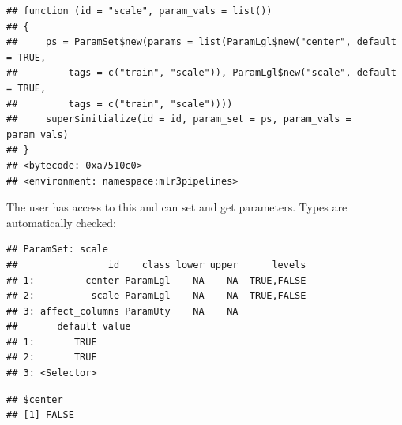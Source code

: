 \documentclass[]{article}
\newenvironment{Shaded}{\begin{snugshade}}{\end{snugshade}}
\newcommand{\CommentTok}[1]{\textcolor[rgb]{0.56,0.35,0.01}{\textit{#1}}}
\newcommand{\KeywordTok}[1]{\textcolor[rgb]{0.13,0.29,0.53}{\textbf{#1}}}
\newcommand{\NormalTok}[1]{#1}
\newcommand{\OperatorTok}[1]{\textcolor[rgb]{0.81,0.36,0.00}{\textbf{#1}}}
\newcommand{\OtherTok}[1]{\textcolor[rgb]{0.56,0.35,0.01}{#1}}
\newcommand{\StringTok}[1]{\textcolor[rgb]{0.31,0.60,0.02}{#1}}
\renewenvironment{Shaded} {\begin{snugshade}\small} {\end{snugshade}}
\begin{document}
\begin{verbatim}
## function (id = "scale", param_vals = list()) 
## {
##     ps = ParamSet$new(params = list(ParamLgl$new("center", default = TRUE, 
##         tags = c("train", "scale")), ParamLgl$new("scale", default = TRUE, 
##         tags = c("train", "scale"))))
##     super$initialize(id = id, param_set = ps, param_vals = param_vals)
## }
## <bytecode: 0xa7510c0>
## <environment: namespace:mlr3pipelines>
\end{verbatim}

The user has access to this and can set and get parameters. Types are automatically checked:

\begin{Shaded}
\end{Shaded}

\begin{verbatim}
## ParamSet: scale
##                id    class lower upper      levels
## 1:         center ParamLgl    NA    NA  TRUE,FALSE
## 2:          scale ParamLgl    NA    NA  TRUE,FALSE
## 3: affect_columns ParamUty    NA    NA            
##       default value
## 1:       TRUE      
## 2:       TRUE      
## 3: <Selector>
\end{verbatim}

\begin{Shaded}
\end{Shaded}

\begin{verbatim}
## $center
## [1] FALSE
\end{verbatim}

\begin{Shaded}
\end{Shaded}
\end{document}
